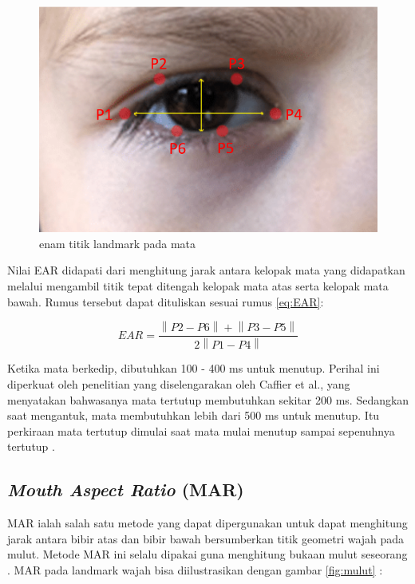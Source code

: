 \begin{figure} [H] \centering
  \includegraphics[scale=0.35]{gambar/mata.png}
  \caption{enam titik landmark pada mata \parencite{20}}
  \label{fig:mata}
\end{figure}

Nilai EAR didapati dari menghitung jarak antara kelopak mata yang didapatkan melalui mengambil titik tepat ditengah
kelopak mata atas serta kelopak mata bawah. Rumus tersebut dapat dituliskan sesuai rumus \ref{eq:EAR}:

\begin{equation}
  \label{eq:EAR}
  EAR = \frac{\left \| P2-P6 \right \| + \left \| P3-P5 \right \|}{2 \left \| P1-P4 \right \|}
\end{equation}

Ketika mata berkedip, dibutuhkan 100 - 400 ms untuk menutup. Perihal ini diperkuat oleh penelitian yang diselengarakan
oleh Caffier et al., yang menyatakan bahwasanya mata tertutup membutuhkan sekitar 200 ms. Sedangkan saat mengantuk,
mata membutuhkan lebih dari 500 ms untuk menutup. Itu perkiraan mata tertutup dimulai saat mata mulai menutup sampai
sepenuhnya tertutup \parencite{17}.

\subsection{\emph{Mouth Aspect Ratio} (MAR)}
MAR ialah salah satu metode yang dapat dipergunakan untuk dapat menghitung jarak antara bibir atas dan bibir bawah
bersumberkan titik geometri wajah pada mulut. Metode MAR ini selalu dipakai guna menghitung bukaan mulut seseorang \parencite{12}.
MAR pada landmark wajah bisa diilustrasikan dengan gambar \ref{fig:mulut} :

